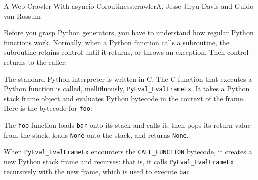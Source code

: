 \begin{aosachapter}{A Web Crawler With asyncio Coroutines}{s:crawler}{A. Jesse Jiryu Davis and Guido van Rossum}
\label{how-python-generators-work}

Before you grasp Python generators, you have to understand how regular
Python functions work. Normally, when a Python function calls a
subroutine, the subroutine retains control until it returns, or throws
an exception. Then control returns to the caller:

\begin{Shaded}
\begin{Highlighting}[]
\NormalTok{>>> } 
\NormalTok{>>> } 
\end{Highlighting}
\end{Shaded}

The standard Python interpreter is written in C. The C function that
executes a Python function is called, mellifluously,
\texttt{PyEval\_EvalFrameEx}. It takes a Python stack frame object and
evaluates Python bytecode in the context of the frame. Here is the
bytecode for \texttt{foo}:

\begin{Shaded}
\begin{Highlighting}[]
\NormalTok{>>> } 
               
                \NormalTok{(}  
               
                \NormalTok{(}\NormalTok{)}
              
\end{Highlighting}
\end{Shaded}

The \texttt{foo} function loads \texttt{bar} onto its stack and calls
it, then pops its return value from the stack, loads \texttt{None} onto
the stack, and returns \texttt{None}.

When \texttt{PyEval\_EvalFrameEx} encounters the \texttt{CALL\_FUNCTION}
bytecode, it creates a new Python stack frame and recurses: that is, it
calls \texttt{PyEval\_EvalFrameEx} recursively with the new frame, which
is used to execute \texttt{bar}.



\end{aosachapter}

